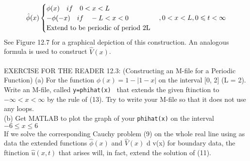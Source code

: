\documentclass[../main.tex]{subfiles}
\begin{document}
\begin{equation}
\hat{\phi}(x)
	\begin{cases} 
\phi (x)   ~~~ if~~~ 0< x< L\\
-\phi (-x) ~~~ if ~~~ -L < x <0\\
$Extend to be periodic of period 2L$\\
\end{cases}		
,0 < x < L, 0\leqslant t  < \infty	
\end{equation}
See Figure 12.7 for a graphical depiction of this construction. An analogous
formula is used to construct $\hat{V}(x)$.\\
\\
EXERCISE FOR THE READER 12.3: (Constructing an M-file for a Periodic
Function) (a) For the function $\phi(x) = 1-|1-x|$ on the interval [0, 2] (L = 2).
Write an M-file, called \texttt{y=phihat(x) } that extends the given ftinction to $-\infty < x<\infty$  by the rule of (13). Try to write your M-file so that it does not use
any loops.
\\
(b) Get MATLAB to plot the graph of your \texttt{phihat(x)} on the interval  $-6\leqslant x \leqslant 6$\\

If we solve the corresponding Cauchy problem (9) on the whole real line using as
data the extended functions $\hat{\phi}(x)$ and $\hat{V}(x)$ d v(x) for boundary data, the ftinction $\hat{u}(x,t)$ that arises will, in fact, extend the solution of (11). 
\end{document}
